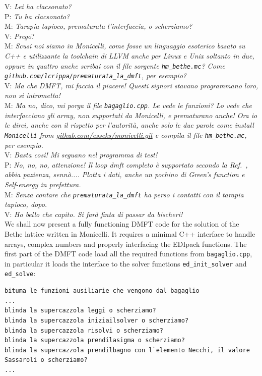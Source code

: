 \documentclass[edipack_sp.tex]{subfiles}
\begin{document}
\begin{appendix}
\noindent
V: {\it Lei ha clacsonato?}\\
P: {\it Tu ha clacsonato?}\\
M: {\it Tarapia tapioco, prematurata l'interfaccia, o scherziamo?}\\
V: {\it Prego}?\\
M: {\it Scusi noi siamo in Monicelli, come fosse un linguaggio esoterico
basato su C++ e utilizzante la toolchain di LLVM anche per Linux e
Unix soltanto in due, oppure in quattro anche scribai con il file
sorgente {\tt hm\_bethe.mc}?  Come {\tt
  github.com/lcrippa/prematurata\_la\_dmft}, per esempio?}\\
V: {\it Ma che DMFT, mi faccia il piacere! Questi signori stavano
programmano loro, non si intrometta!}\\
M: {\it Ma no, dico, mi porga il file {\tt bagaglio.cpp}. Le vede le
funzioni? Lo vede che interfacciano gli array, non supportati da
Monicelli, e prematurano anche! 
Ora io le direi, anche con il rispetto per l'autorità, anche solo le
due parole come install {\tt Monicelli} from
\href{https://github.com/esseks/monicelli.git}{github.com/esseks/monicelli.git}
e compila il file {\tt hm\_bethe.mc}, per esempio.}\\
V: {\it Basta così! Mi seguano nel programma di test!}\\
P: {\it No, no, no, attenzione! Il loop dmft completo \`e supportato
secondo la Ref.~, abbia pazienza,
senn\`o.... Plotta i dati, anche un pochino di Green's function e
Self-energy in prefettura.}\\
M: {\it Senza contare che {\tt prematurata\_la\_dmft} ha perso i contatti con il tarapia tapioco, dopo.}\\
V: {\it Ho bello che capito. Si farà finta di passar da bischeri!}\\

We shall now present a fully functioning DMFT code for
the solution of the Bethe lattice written in Monicelli. It requires a minimal C++
interface to handle arrays, complex numbers and properly interfacing
the EDIpack functions.
The first part of the DMFT code load all the required functions from
{\tt bagaglio.cpp}, in particular it loads the interface to the \NAME
solver functions {\tt ed\_init\_solver} and {\tt ed\_solve}:

\begin{lstlisting}[style=cstyle]
bituma le funzioni ausiliarie che vengono dal bagaglio
...
blinda la supercazzola leggi o scherziamo?
blinda la supercazzola iniziailsolver o scherziamo?
blinda la supercazzola risolvi o scherziamo?
blinda la supercazzola prendilasigma o scherziamo?
blinda la supercazzola prendilbagno con l`elemento Necchi, il valore Sassaroli o scherziamo?
...
\end{lstlisting}


\end{appendix}
\end{document}
